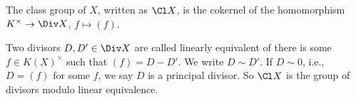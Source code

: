 The class group of $X$, written as $\Cl X$, is the cokernel of the homomorphism
$K^\times \to \Div X$, $f\mapsto (f)$.

Two divisors $D, D' \in \Div X$ are called linearly equivalent of there is some
 $f \in K(X)^\times$ such that $(f) = D - D'$. We write $D\sim D'$.
 If $D\sim 0$, i.e., $D = (f)$ for some $f$, we say $D$ is a principal divisor.
 So $\Cl X$ is the group of divisors modulo linear equivalence.

